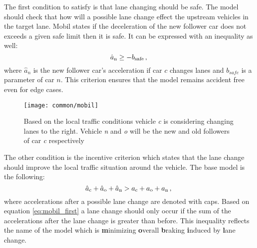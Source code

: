 		The first condition to satisfy is that lane changing should be safe. The model should check that how will a possible lane change effect the upstream vehicles in the target lane. Mobil states if the deceleration of the new follower car does not exceeds a given safe limit then it is safe. It can be expressed with an inequality as well:
		\begin{equation}
			\hat{a}_{\rm n}\geq -b_{\rm safe}\,,
		\end{equation}
		where $\hat{a}_n$ is the new follower car's acceleration if car $c$ changes lanes and $b_{safe}$ is a parameter of car $n$. This criterion ensures that the model remains accident free even for edge cases.
			\begin{figure}[ht]
				\centering
				\texttt{[image: common/mobil]}
				\caption{Based on the local traffic conditions vehicle \textit{c} is considering changing lanes  to the right. Vehicle \textit{n} and \textit{o} will be the new and old followers of car \textit{c} respectively}
				\label{fig:mobil}
			\end{figure}
			The other condition is the incentive criterion which states that the lane change should improve the local traffic situation around the vehicle.  The base model is the following:
			\begin{equation}
				\hat{a}_{\rm c} + \hat{a}_{\rm o} + \hat{a}_{\rm n} > a_{\rm c} + a_{\rm o} + a_{\rm n}\,,
				\label{eq:mobil_first}
			\end{equation}
			where accelerations after a possible lane change are denoted with caps.
			Based on equation \ref{eq:mobil_first} a lane change should only occur if the sum of the accelerations after the lane change is greater than before. This inequality reflects the name of the model which is \textbf{m}inimizing \textbf{o}verall \textbf{b}raking \textbf{i}nduced by \textbf{l}ane change.

